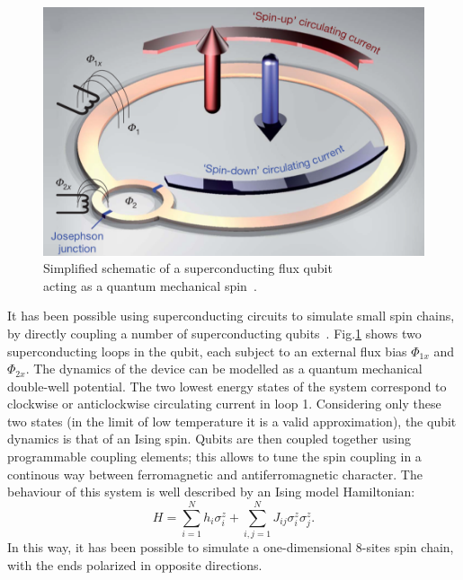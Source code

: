 \begin{figure}[H]
    \centering
    \includegraphics[scale=0.5]{Figures/superconductinCircuit_SpinSystem.png}
    \captionsetup{width=1.\linewidth}
    \caption{Simplified schematic of a superconducting flux qubit \\acting as a quantum mechanical spin~\cite{8spinChain_simulatedByQubits}.}
    \label{fig:superconductinCircuit_SpinSystem}
\end{figure}

It has been possible using superconducting circuits to simulate small spin chains, by directly coupling a number of superconducting qubits~\cite{8spinChain_simulatedByQubits}. Fig.\ref{fig:superconductinCircuit_SpinSystem} shows two superconducting loops in the qubit, each subject to an external flux bias $\Phi_{1x}$ and $\Phi_{2x}$. The dynamics of the device can be modelled as a quantum mechanical double-well potential. The two lowest energy states of the system correspond to clockwise or anticlockwise circulating current in loop 1. Considering only these two states (in the limit of low temperature it is a valid approximation), the qubit dynamics is that of an Ising spin. Qubits are then coupled together using programmable coupling elements; this allows to tune the spin coupling in a continous way between ferromagnetic and antiferromagnetic character. The behaviour of this system is well described by an Ising model Hamiltonian:
\begin{equation}
    H = \sum_{i=1}^{N} h_i\sigma_i^z + \sum_{i,j=1}^{N} J_{ij}\sigma_i^z\sigma_j^z.
\end{equation}
In this way, it has been possible to simulate a one-dimensional 8-sites spin chain, with the ends polarized in opposite directions.